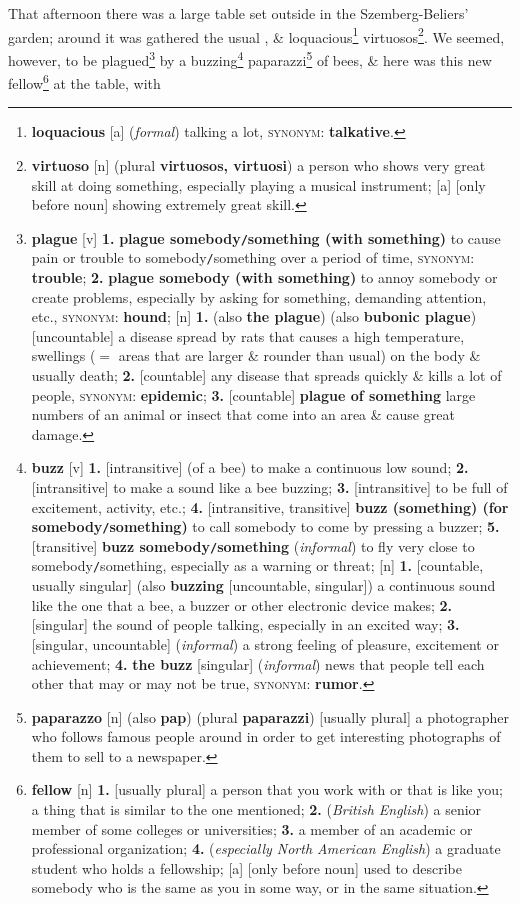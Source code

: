 \documentclass[oneside]{book}
\numberwithin{equation}{section}
\begin{document}
That afternoon there was a large table set outside in the Szemberg-Beliers' garden; around it was gathered the usual , \& loquacious\footnote{\textbf{loquacious} [a] (\textit{formal}) talking a lot, \textsc{synonym}: \textbf{talkative}.} virtuosos\footnote{\textbf{virtuoso} [n] (plural \textbf{virtuosos, virtuosi}) a person who shows very great skill at doing something, especially playing a musical instrument; [a] [only before noun] showing extremely great skill.}. We seemed, however, to be plagued\footnote{\textbf{plague} [v] \textbf{1.} \textbf{plague somebody\texttt{/}something (with something)} to cause pain or trouble to somebody\texttt{/}something over a period of time, \textsc{synonym}: \textbf{trouble}; \textbf{2.} \textbf{plague somebody (with something)} to annoy somebody or create problems, especially by asking for something, demanding attention, etc., \textsc{synonym}: \textbf{hound}; [n] \textbf{1.} (also \textbf{the plague}) (also \textbf{bubonic plague}) [uncountable] a disease spread by rats that causes a high temperature, swellings ($=$ areas that are larger \& rounder than usual) on the body \& usually death; \textbf{2.} [countable] any disease that spreads quickly \& kills a lot of people, \textsc{synonym}: \textbf{epidemic}; \textbf{3.} [countable] \textbf{plague of something} large numbers of an animal or insect that come into an area \& cause great damage.} by a buzzing\footnote{\textbf{buzz} [v] \textbf{1.} [intransitive] (of a bee) to make a continuous low sound; \textbf{2.} [intransitive] to make a sound like a bee buzzing; \textbf{3.} [intransitive] to be full of excitement, activity, etc.; \textbf{4.} [intransitive, transitive] \textbf{buzz (something) (for somebody\texttt{/}something)} to call somebody to come by pressing a buzzer; \textbf{5.} [transitive] \textbf{buzz somebody\texttt{/}something} (\textit{informal}) to fly very close to somebody\texttt{/}something, especially as a warning or threat; [n] \textbf{1.} [countable, usually singular] (also \textbf{buzzing} [uncountable, singular]) a continuous sound like the one that a bee, a buzzer or other electronic device makes; \textbf{2.} [singular] the sound of people talking, especially in an excited way; \textbf{3.} [singular, uncountable] (\textit{informal}) a strong feeling of pleasure, excitement or achievement; \textbf{4.} \textbf{the buzz} [singular] (\textit{informal}) news that people tell each other that may or may not be true, \textsc{synonym}: \textbf{rumor}.} paparazzi\footnote{\textbf{paparazzo} [n] (also \textbf{pap}) (plural \textbf{paparazzi}) [usually plural] a photographer who follows famous people around in order to get interesting photographs of them to sell to a newspaper.} of bees, \& here was this new fellow\footnote{\textbf{fellow} [n] \textbf{1.} [usually plural] a person that you work with or that is like you; a thing that is similar to the one mentioned; \textbf{2.} (\textit{British English}) a senior member of some colleges or universities; \textbf{3.} a member of an academic or professional organization; \textbf{4.} (\textit{especially North American English}) a graduate student who holds a fellowship; [a] [only before noun] used  to describe somebody who is the same as you in some way, or in the same situation.} at the table, with 
\end{document}
